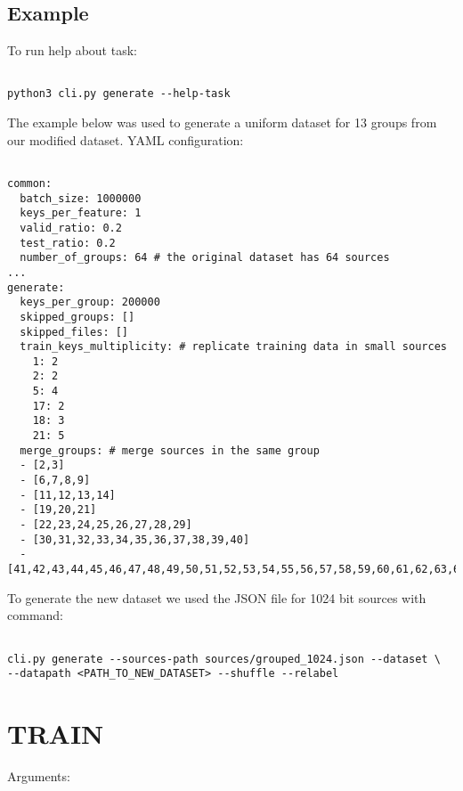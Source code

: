 \subsection*{Example}

To run help about task:

\begin{verbatim}

python3 cli.py generate --help-task

\end{verbatim}

\noindent
The example below was used to generate a uniform dataset for 13 groups from our  modified dataset. YAML configuration:

\begin{verbatim}

common:
  batch_size: 1000000
  keys_per_feature: 1
  valid_ratio: 0.2
  test_ratio: 0.2
  number_of_groups: 64 # the original dataset has 64 sources
...  
generate:
  keys_per_group: 200000
  skipped_groups: []
  skipped_files: []
  train_keys_multiplicity: # replicate training data in small sources
    1: 2
    2: 2
    5: 4
    17: 2
    18: 3
    21: 5
  merge_groups: # merge sources in the same group
  - [2,3]
  - [6,7,8,9]
  - [11,12,13,14]
  - [19,20,21]
  - [22,23,24,25,26,27,28,29]
  - [30,31,32,33,34,35,36,37,38,39,40]
  - [41,42,43,44,45,46,47,48,49,50,51,52,53,54,55,56,57,58,59,60,61,62,63,64]
\end{verbatim}

\noindent
To generate the new dataset we used the JSON file for 1024 bit sources with command:

\begin{verbatim}

cli.py generate --sources-path sources/grouped_1024.json --dataset \
--datapath <PATH_TO_NEW_DATASET> --shuffle --relabel 

\end{verbatim}

\section{TRAIN}

\noindent
Arguments:

